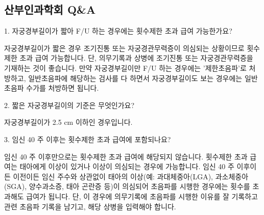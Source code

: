 \subsection{산부인과학회 Q\&A}
\prezi{\clearpage}
1. 자궁경부길이가 짧아 F/U 하는 경우에는 횟수제한 초과 급여 가능한가요?
\begin{quotebox}
자궁경부길이가 짧은 경우 조기진통 또는 자궁경관무력증이 의심되는 상황이므로 횟수제한 초과 급여 가능합니다. 단, 의무기록과 상병에 조기진통 또는 자궁경관무력증을 기재하는 것이 좋습니다. 만약
자궁경부길이만 F/U 하는 경우에는 '제한초음파'로 처방하고, 일반초음파에 해당하는 검사를 다 하면서 자궁경부길이도 보는 경우에는 일반 초음파 수가를 처방하면 됩니다.
\end{quotebox}
2. 짧은 자궁경부길이의 기준은 무엇인가요?
\begin{quotebox}
자궁경부길이가 2.5 cm 이하인 경우입니다.
\end{quotebox}
\prezi{\clearpage}
3. 임신 40 주 이후는 횟수제한 초과 급여에 포함되나요?
\begin{quotebox}
임신 40 주 이후만으로는 횟수제한 초과 급여에 해당되지 않습니다. 횟수제한 초과 급여는 태아에게 이상이 있거나 이상이 의심되는 경우에 가능합니다. 임신 40 주 이후이든 이전이든 임신 주수와
상관없이 태아의 이상(예: 과대체중아(LGA), 과소체중아(SGA), 양수과소증, 태아 곤란증 등)이 의심되어
초음파를 시행한 경우에는 횟수를 초과해도 급여가 됩니다. 단, 이 경우에 의무기록에 초음파를 시행한
이유를 잘 기록하고 관련 초음파 기록을 남기고, 해당 상병을 입력해야 합니다. 
\end{quotebox}
\prezi{\clearpage}
